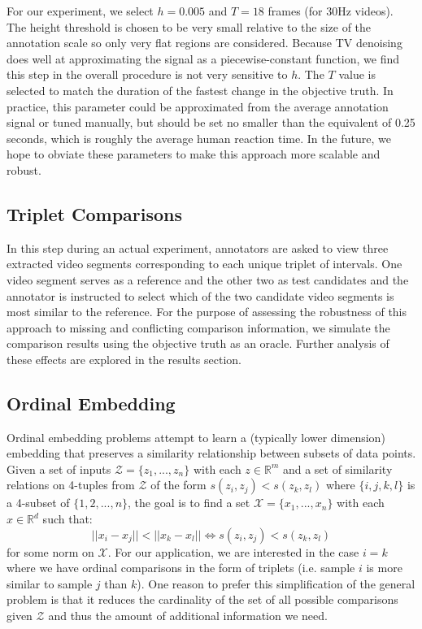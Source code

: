 \documentclass[times,twocolumn,final,authoryear]{elsarticle}
\begin{document}
For our experiment, we select $h=0.005$ and $T=18$ frames (for 30Hz videos).  The height threshold is chosen to be very small relative to the size of the annotation scale so only very flat regions are considered.  Because TV denoising does well at approximating the signal as a piecewise-constant function, we find this step in the overall procedure is not very sensitive to $h$.  The $T$ value is selected to match the duration of the fastest change in the objective truth.  In practice, this parameter could be approximated from the average annotation signal or tuned manually, but should be set no smaller than the equivalent of 0.25 seconds, which is roughly the average human reaction time.  In the future, we hope to obviate these parameters to make this approach more scalable and robust.

\subsection{Triplet Comparisons}
In this step during an actual experiment, annotators are asked to view three extracted video segments corresponding to each unique triplet of intervals.  One video segment serves as a reference and the other two as test candidates and the annotator is instructed to select which of the two candidate video segments is most similar to the reference.  For the purpose of assessing the robustness of this approach to missing and conflicting comparison information, we simulate the comparison results using the objective truth as an oracle.  Further analysis of these effects are explored in the results section.

\subsection{Ordinal Embedding}
Ordinal embedding problems attempt to learn a (typically lower dimension) embedding that preserves a similarity relationship between subsets of data points.  Given a set of inputs $\mathcal{Z} = \{z_1,...,z_n\}$ with each $z \in \mathbb{R}^m$ and a set of similarity relations on 4-tuples from $\mathcal{Z}$ of the form $s(z_i,z_j) < s(z_k,z_l)$ where $\{i,j,k,l\}$ is a 4-subset of $\{1,2,...,n\}$, the goal is to find a set $\mathcal{X} = \{x_1,...,x_n\}$ with each $x \in \mathbb{R}^d$ such that:
\begin{equation*}
||x_i-x_j|| < ||x_k-x_l|| \Longleftrightarrow s(z_i,z_j) < s(z_k,z_l)
\end{equation*}
\noindent
for some norm on $\mathcal{X}$. For our application, we are interested in the case $i=k$ where we have ordinal comparisons in the form of triplets (i.e. sample $i$ is more similar to sample $j$ than $k$).  One reason to prefer this simplification of the general problem is that it reduces the cardinality of the set of all possible comparisons given $\mathcal{Z}$ and thus the amount of additional information we need.
\end{document}
